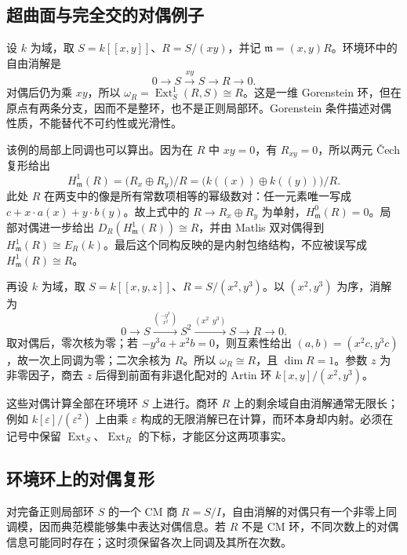 \subsection{超曲面与完全交的对偶例子}
\label{b3:subsec:2204:02}

设 \(k\) 为域，取 \(S=k[\![x,y]\!]\)、\(R=S/(xy)\)，并记 \(\mathfrak m=(x,y)R\)。环境环中的自由消解是
\[
	0\longrightarrow S\xrightarrow{xy}S\longrightarrow R\longrightarrow0.
\]
对偶后仍为乘 \(xy\)，所以 \(\omega_R=\operatorname{Ext}_S^1(R,S)\cong R\)。这是一维 Gorenstein 环，但在原点有两条分支，因而不是整环，也不是正则局部环。Gorenstein 条件描述对偶性质，不能替代不可约性或光滑性。

\ProseParagraphBreak
该例的局部上同调也可以算出。因为在 \(R\) 中 \(xy=0\)，有 \(R_{xy}=0\)，所以两元 Čech 复形给出
\[
	H_{\mathfrak m}^1(R)=\bigl(R_x\oplus R_y\bigr)/R =\bigl(k(\!(x)\!)\oplus k(\!(y)\!)\bigr)/R.
\]
此处 \(R\) 在两支中的像是所有常数项相等的幂级数对：任一元素唯一写成 \(c+x\cdot a(x)+y\cdot b(y)\)。故上式中的 \(R\to R_x\oplus R_y\) 为单射，\(H_{\mathfrak m}^0(R)=0\)。局部对偶进一步给出 \(D_R(H_{\mathfrak m}^1(R))\cong R\)，并由 Matlis 双对偶得到 \(H_{\mathfrak m}^1(R)\cong E_R(k)\)。最后这个同构反映的是内射包络结构，不应被误写成 \(H_{\mathfrak m}^1(R)\cong R\)。

\ProseParagraphBreak
再设 \(k\) 为域，取 \(S=k[\![x,y,z]\!]\)、\(R=S/(x^2,y^3)\)。以 \((x^2,y^3)\) 为序，消解为
\[
	0\longrightarrow S\xrightarrow{\binom{-y^3}{x^2}}S^2 \xrightarrow{(x^2\ \ y^3)}S\longrightarrow R\longrightarrow0.
\]
取对偶后，零次核为零；若 \(-y^3a+x^2b=0\)，则互素性给出 \((a,b)=(x^2c,y^3c)\)，故一次上同调为零；二次余核为 \(R\)。所以 \(\omega_R\cong R\)，且 \(\dim R=1\)。参数 \(z\) 为非零因子，商去 \(z\) 后得到前面有非退化配对的 Artin 环 \(k[x,y]/(x^2,y^3)\)。

\ProseParagraphBreak
这些对偶计算全部在环境环 \(S\) 上进行。商环 \(R\) 上的剩余域自由消解通常无限长；例如 \(k[\varepsilon]/(\varepsilon^2)\) 上由乘 \(\varepsilon\) 构成的无限消解已在计算，而环本身却内射。必须在记号中保留 \(\operatorname{Ext}_S\)、\(\operatorname{Ext}_R\) 的下标，才能区分这两项事实。

\subsection{环境环上的对偶复形}
\label{b3:subsec:2204:03}

对完备正则局部环 \(S\) 的一个 CM 商 \(R=S/I\)，自由消解的对偶只有一个非零上同调模，因而典范模能够集中表达对偶信息。若 \(R\) 不是 CM 环，不同次数上的对偶信息可能同时存在；这时须保留各次上同调及其所在次数。

